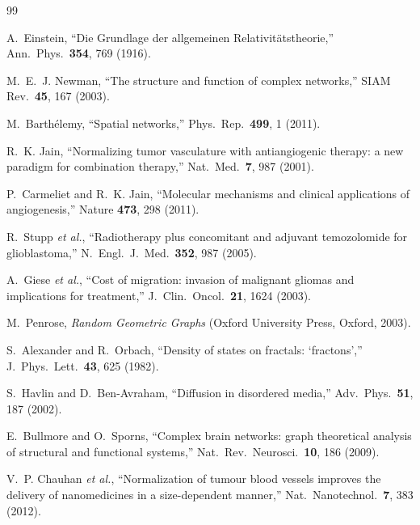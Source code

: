\documentclass[aps,pre,twocolumn,superscriptaddress,10pt,floatfix]{revtex4-2}
\begin{document}

\begin{thebibliography}{99}

A.~Einstein, ``Die Grundlage der allgemeinen Relativit\"atstheorie,'' Ann.\ Phys.\ \textbf{354}, 769 (1916).

M.~E.~J. Newman, ``The structure and function of complex networks,'' SIAM Rev.\ \textbf{45}, 167 (2003).

M.~Barth\'elemy, ``Spatial networks,'' Phys.\ Rep.\ \textbf{499}, 1 (2011).

R.~K. Jain, ``Normalizing tumor vasculature with antiangiogenic therapy: a new paradigm for combination therapy,'' Nat.\ Med.\ \textbf{7}, 987 (2001).

P.~Carmeliet and R.~K. Jain, ``Molecular mechanisms and clinical applications of angiogenesis,'' Nature \textbf{473}, 298 (2011).

R.~Stupp \emph{et al.}, ``Radiotherapy plus concomitant and adjuvant temozolomide for glioblastoma,'' N.\ Engl.\ J.\ Med.\ \textbf{352}, 987 (2005).

A.~Giese \emph{et al.}, ``Cost of migration: invasion of malignant gliomas and implications for treatment,'' J.\ Clin.\ Oncol.\ \textbf{21}, 1624 (2003).

M.~Penrose, \emph{Random Geometric Graphs} (Oxford University Press, Oxford, 2003).

S.~Alexander and R.~Orbach, ``Density of states on fractals: `fractons','' J.\ Phys.\ Lett.\ \textbf{43}, 625 (1982).

S.~Havlin and D.~Ben-Avraham, ``Diffusion in disordered media,'' Adv.\ Phys.\ \textbf{51}, 187 (2002).

E.~Bullmore and O.~Sporns, ``Complex brain networks: graph theoretical analysis of structural and functional systems,'' Nat.\ Rev.\ Neurosci.\ \textbf{10}, 186 (2009).

V.~P. Chauhan \emph{et al.}, ``Normalization of tumour blood vessels improves the delivery of nanomedicines in a size-dependent manner,'' Nat.\ Nanotechnol.\ \textbf{7}, 383 (2012).

\end{thebibliography}
\end{document}
